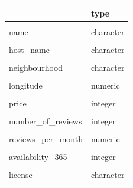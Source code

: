 \documentclass[a4paper, justified]{tufte-handout}\usepackage[]{graphicx}\usepackage[]{xcolor}
\newenvironment{knitrout}{}{} %
\newenvironment{RTable}[1]{\begin{margintable}\begin{center}\begin{tabular}{#1}}{\end{tabular}\end{center}\end{margintable}}
\begin{document}
\begin{knitrout}
\begin{RTable}{l|l}
\hline
  & type\\
\hline
\cellcolor{gray!6}{id} & \cellcolor{gray!6}{numeric}\\
\hline
name & character\\
\hline
\cellcolor{gray!6}{host\_id} & \cellcolor{gray!6}{integer}\\
\hline
host\_name & character\\
\hline
\cellcolor{gray!6}{neighbourhood\_group} & \cellcolor{gray!6}{logical}\\
\hline
neighbourhood & character\\
\hline
\cellcolor{gray!6}{latitude} & \cellcolor{gray!6}{numeric}\\
\hline
longitude & numeric\\
\hline
\cellcolor{gray!6}{room\_type} & \cellcolor{gray!6}{character}\\
\hline
price & integer\\
\hline
\cellcolor{gray!6}{minimum\_nights} & \cellcolor{gray!6}{integer}\\
\hline
number\_of\_reviews & integer\\
\hline
\cellcolor{gray!6}{last\_review} & \cellcolor{gray!6}{character}\\
\hline
reviews\_per\_month & numeric\\
\hline
\cellcolor{gray!6}{calculated\_host\_listings\_count} & \cellcolor{gray!6}{integer}\\
\hline
availability\_365 & integer\\
\hline
\cellcolor{gray!6}{number\_of\_reviews\_ltm} & \cellcolor{gray!6}{integer}\\
\hline
license & character\\
\hline
\end{RTable}
\endgroup{}

\end{knitrout}
\end{document}
